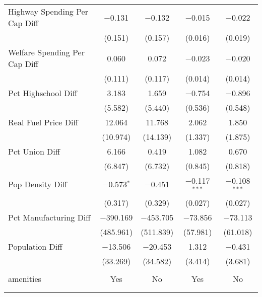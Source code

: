 \begin{table}[!htbp]
\begin{tabular}{@{\extracolsep{5pt}}lcccc}
  Highway Spending Per Cap Diff & $-$0.131 & $-$0.132 & $-$0.015 & $-$0.022 \\ 
  & (0.151) & (0.157) & (0.016) & (0.019) \\ 
  Welfare Spending Per Cap Diff & 0.060 & 0.072 & $-$0.023 & $-$0.020 \\ 
  & (0.111) & (0.117) & (0.014) & (0.014) \\ 
  Pct Highschool Diff & 3.183 & 1.659 & $-$0.754 & $-$0.896 \\ 
  & (5.582) & (5.440) & (0.536) & (0.548) \\ 
  Real Fuel Price Diff & 12.064 & 11.768 & 2.062 & 1.850 \\ 
  & (10.974) & (14.139) & (1.337) & (1.875) \\ 
  Pct Union Diff & 6.166 & 0.419 & 1.082 & 0.670 \\ 
  & (6.847) & (6.732) & (0.845) & (0.818) \\ 
  Pop Density Diff & $-$0.573$^{*}$ & $-$0.451 & $-$0.117$^{***}$ & $-$0.108$^{***}$ \\ 
  & (0.317) & (0.329) & (0.027) & (0.027) \\ 
  Pct Manufacturing Diff & $-$390.169 & $-$453.705 & $-$73.856 & $-$73.113 \\ 
  & (485.961) & (511.839) & (57.981) & (61.018) \\ 
  Population Diff & $-$13.506 & $-$20.453 & 1.312 & $-$0.431 \\ 
  & (33.269) & (34.582) & (3.414) & (3.681) \\ 
 \hline \\[-1.8ex] 
amenities & Yes & No & Yes & No \\ 
\hline \\[-1.8ex] 
\hline 
\hline \\[-1.8ex] 
\end{tabular} 
\end{table} 
